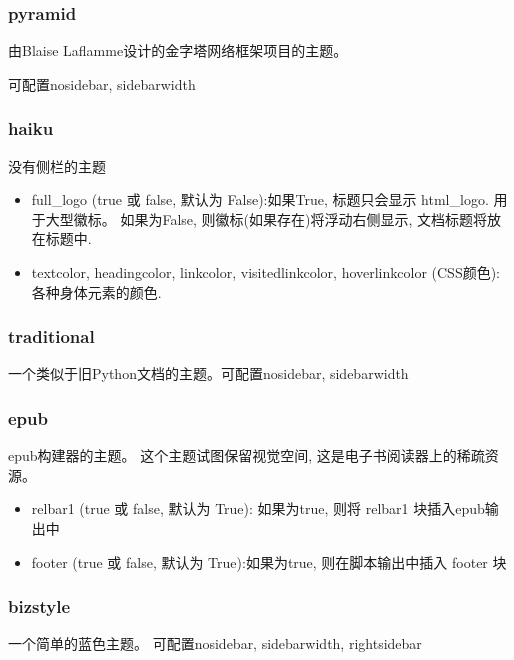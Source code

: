 \documentclass[a4paper,10pt,english]{sphinxmanual}
\begin{document}
\subsubsection{pyramid}
\label{\detokenize{sphinx_conf:pyramid}}
\sphinxAtStartPar
由Blaise Laflamme设计的金字塔网络框架项目的主题。

\sphinxAtStartPar
可配置nosidebar, sidebarwidth


\subsubsection{haiku}
\label{\detokenize{sphinx_conf:haiku}}
\sphinxAtStartPar
没有侧栏的主题
\begin{itemize}
\item {} 
\sphinxAtStartPar
full\_logo (true 或 false, 默认为 False):如果True, 标题只会显示 html\_logo. 用于大型徽标。 如果为False, 则徽标(如果存在)将浮动右侧显示, 文档标题将放在标题中.

\item {} 
\sphinxAtStartPar
textcolor, headingcolor, linkcolor, visitedlinkcolor, hoverlinkcolor (CSS颜色):各种身体元素的颜色.

\end{itemize}


\subsubsection{traditional}
\label{\detokenize{sphinx_conf:traditional}}
\sphinxAtStartPar
一个类似于旧Python文档的主题。可配置nosidebar, sidebarwidth


\subsubsection{epub}
\label{\detokenize{sphinx_conf:id17}}
\sphinxAtStartPar
epub构建器的主题。 这个主题试图保留视觉空间, 这是电子书阅读器上的稀疏资源。
\begin{itemize}
\item {} 
\sphinxAtStartPar
relbar1 (true 或 false, 默认为 True): 如果为true, 则将 relbar1 块插入epub输出中

\item {} 
\sphinxAtStartPar
footer (true 或 false, 默认为 True):如果为true, 则在脚本输出中插入 footer 块

\end{itemize}


\subsubsection{bizstyle}
\label{\detokenize{sphinx_conf:bizstyle}}
\sphinxAtStartPar
一个简单的蓝色主题。 可配置nosidebar, sidebarwidth, rightsidebar
\end{document}
